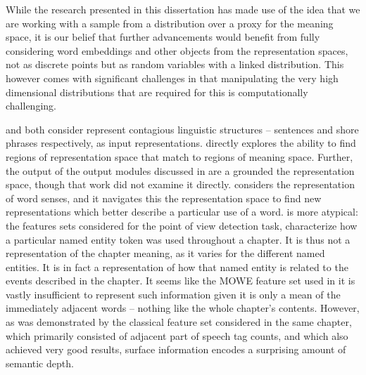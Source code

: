 \documentclass{book}
\begin{document}
While the research presented in this dissertation has made use of the idea that we are working with a sample from a distribution over a proxy for the meaning space,
it is our belief that further advancements would benefit from fully considering
word embeddings and other objects from the representation spaces, not as discrete points but as random variables with a linked distribution.
This however comes with significant challenges in that manipulating the very high dimensional distributions that are required for this is computationally challenging.



 and  both consider represent contagious linguistic structures -- sentences and shore phrases respectively, as input representations.
 directly explores the ability to find regions of representation space that match to regions of meaning space.
Further, the output of the output modules discussed in  are a grounded the representation space, though that work did not examine it directly.
 considers the representation of word senses, and it navigates this the representation space to find new representations which better describe a particular use of a word.
 is more atypical:
the features sets considered for the point of view detection task,
characterize how a particular named entity token was used throughout a chapter.
It is thus not a representation of the chapter meaning, as it varies for the different named entities.
It is in fact a representation of how that named entity is related to the events described in the chapter.
It seems like the MOWE feature set used in  it is vastly insufficient to represent such information given it is only a mean of the immediately adjacent words -- nothing like the whole chapter's contents.
However, as was demonstrated by the classical feature set considered in the same chapter, which primarily consisted of adjacent part of speech tag counts, and which also achieved very good results, surface information encodes a surprising amount of semantic depth.
\end{document}
